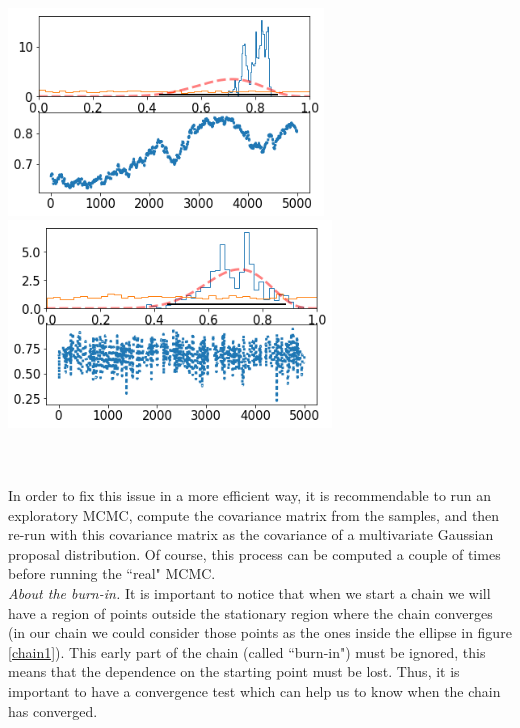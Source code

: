 \documentclass[onecolumn,           %
               showpacs,            %
               preprintnumbers,     %
               aps,                 %
               prl,          	    %
               letterpaper,             %
               superscriptaddress,      %
               nofootinbib,         %
               tightenlines,        %
               floats,floatfix      %
               ,usenatbib,
               ]{revtex4-1}
\begin{document}
\begin{minipage}{\textwidth}
\centering
\includegraphics[height=5.5cm]{Figures/chain2.png}
\includegraphics[height=5.5cm]{Figures/chain3.png}
\label{chainprop}
\end{minipage}\\ $ $ \\

In order to fix this issue in a more efficient way, it is recommendable to run an exploratory MCMC, compute the covariance matrix from the samples, and then re-run with this covariance matrix as the covariance of a multivariate Gaussian proposal distribution. Of course, this process can be computed a couple of times before running the ``real" MCMC.\\

\textit{About the burn-in.} It is important to notice that when we start a chain we will have a region of points outside the stationary region where the chain converges (in our chain we could consider those points as the ones inside the ellipse in figure \ref{chain1}). This early part of the chain (called ``burn-in") must be ignored, this means that the dependence on the starting point must be lost. Thus, it is important to have a convergence test which can help us to know when the chain has converged.\\
\end{document}
